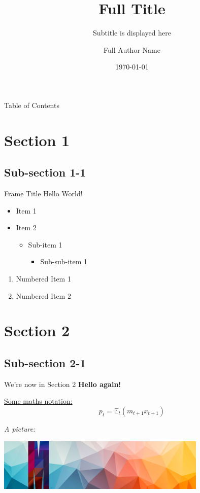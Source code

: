 \documentclass[t]{beamer} %
\title[Short title]{Full Title}
\subtitle{Subtitle is displayed here}
\author[Short Author Name]{Full Author Name}
\institute[Monash Uni]{Department of Banking and Finance, Monash Business School}
\date{\today}
\begin{document}
\begin{frame}
  \titlepage
\end{frame}
 
\begin{frame}{Table of Contents}
  \tableofcontents
\end{frame}


\section{Section 1}

\subsection{Sub-section 1-1}

\begin{frame}{Frame Title}
  Hello World!
\vspace{\baselineskip}
\vspace{\baselineskip}

  \begin{itemize}
    \item Item 1
    \item Item 2
    \begin{itemize} 
      \item Sub-item 1
      \begin{itemize}
        \item Sub-sub-item 1
      \end{itemize}
    \end{itemize}
  \end{itemize}

  \begin{enumerate}
    \item Numbered Item 1
    \item Numbered Item 2
  \end{enumerate}
\end{frame}

\section{Section 2}
\subsection{Sub-section 2-1}
\begin{frame}{We're now in Section 2}
  \textbf{Hello again!} 
  
  \underline{Some maths notation:}
  $$ p_t=\mathbb{E}_t(m_{t+1}x_{t+1}) $$

  \textit{A picture:}
  
  \medskip
  
  \centering\includegraphics[width=10cm]{figures/monash-banner.jpg}
\end{frame}
\end{document}
